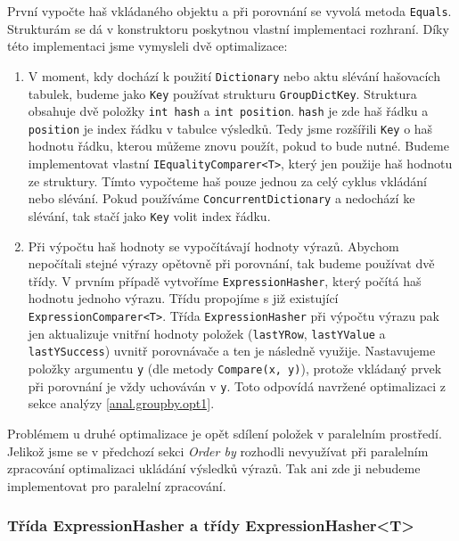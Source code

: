První vypočte haš vkládaného objektu a při porovnání se vyvolá metoda \texttt{Equals}.
Strukturám se dá v konstruktoru poskytnou vlastní implementaci rozhraní.
Díky této implementaci jsme vymysleli dvě optimalizace:
\begin{enumerate}
\item V moment, kdy dochází k použití \texttt{Dictionary} nebo aktu slévání hašovacích tabulek, budeme jako \texttt{Key} používat strukturu \texttt{GroupDictKey}.
Struktura obsahuje dvě položky \texttt{int hash} a \texttt{int position}. 
\texttt{hash} je zde haš řádku a \texttt{position} je index řádku v tabulce výsledků.
Tedy jsme rozšířili \texttt{Key} o haš hodnotu řádku, kterou můžeme znovu použít, pokud to bude nutné.
Budeme implementovat vlastní \texttt{IEqualityComparer<T>}, který jen použije haš hodnotu ze struktury.
Tímto vypočteme haš pouze jednou za celý cyklus vkládání nebo slévání.
Pokud používáme \texttt{ConcurrentDictionary} a nedochází ke slévání, tak stačí jako \texttt{Key} volit index řádku.
\item Při výpočtu haš hodnoty se vypočítávají hodnoty výrazů.
Abychom nepočítali stejné výrazy opětovně při porovnání, tak budeme používat dvě třídy.
V prvním případě vytvoříme \texttt{ExpressionHasher}, který počítá haš hodnotu jednoho výrazu.
Třídu propojíme s již existující \texttt{ExpressionComparer<T>}.
Třída \texttt{ExpressionHasher} při výpočtu výrazu pak jen aktualizuje vnitřní hodnoty položek (\texttt{lastYRow}, \texttt{lastYValue} a \texttt{lastYSuccess}) uvnitř porovnávače a ten je následně využije.
Nastavujeme položky argumentu \texttt{y} (dle metody \texttt{Compare(x, y)}), protože vkládaný prvek při porovnání je vždy uchováván v \texttt{y}.
Toto odpovídá navržené optimalizaci z sekce analýzy \ref{anal.groupby.opt1}.
\end{enumerate}
Problémem u druhé optimalizace je opět sdílení položek v paralelním prostředí.
Jelikož jsme se v předchozí sekci \textit{Order by} rozhodli nevyužívat při paralelním zpracování optimalizaci ukládání výsledků výrazů.
Tak ani zde ji nebudeme implementovat pro paralelní zpracování. 

\subsubsection{Třída ExpressionHasher a třídy ExpressionHasher<T>}

